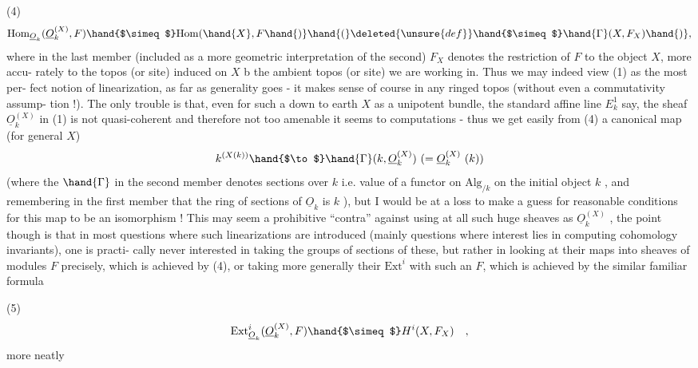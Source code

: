
(4) \[ \mathrm{Hom}_{\underline{O}_k}( \underline{O}_k^{(X)}, F ) \hand{$\simeq$} \mathrm{Hom}(\hand{X},F\hand{)} \hand{(}\deleted{\unsure{def}}\hand{$\simeq$} \hand{\Gamma}(X,F_X)\hand{)}, \]
where in the last member (included as a more geometric interpretation of
the second) $F_X$ denotes the restriction of $F$ to the object $X$, more accu-%
rately to the topos (or site) induced on $X$ b the ambient topos (or
site) we are working in. Thus we may indeed view (1) as the most per-%
fect notion of linearization, as far as generality goes - it makes
sense of course in any ringed topos (without even a commutativity assump-%
tion !). The only trouble is that, even for such a down to earth $X$ as
a unipotent bundle,  the standard affine line $E_k^1$ say, the sheaf
$\underline{O}_k^{(X)}$ in (1) is not quasi-coherent and therefore not too amenable it
seems to computations - thus we get easily from (4) a canonical map
(for general $X$)
\[ k^{(X(k))} \hand{$\to$} \hand{\Gamma}(k, \underline{O}_k^{(X)}) \ (= \underline{O}_k^{(X)}\ (k)) \]
(where the $\hand{\Gamma}$ in the second member denotes sections over $k$ i.e. value of
a functor on $\mathrm{Alg}_{/k}$ on the initial object $k$ , and remembering in the
first member that the ring of sections of $\underline{O}_k$ is $k$ ), but I would be at
a loss to make a guess  for reasonable conditions for this map to
be an isomorphism ! This may seem a prohibitive ``contra'' against using
at all such huge sheaves as $\underline{O}_k^{(X)}$ , the point though is that in most
questions where such linearizations are introduced (mainly questions
where interest lies in computing cohomology invariants), one is practi-%
cally never interested in taking the groups of sections of these, but
rather in looking at their maps into sheaves of modules $F$ precisely,
which is achieved by (4), or taking more generally their $\mathrm{Ext}^i$ with
such an $F$, which is achieved by the similar familiar formula

(5) \[ \mathrm{Ext}^i_{\underline{O}_k}(\underline{O}_k^{(X)}, F ) \hand{$\simeq$} H^i(X,F_X) \quad , \]
more neatly

